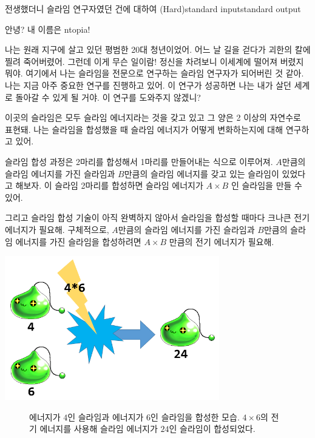 \begin{problem}{전생했더니 슬라임 연구자였던 건에 대하여 (Hard)}{standard input}{standard output}

안녕? 내 이름은 ntopia!

나는 원래 지구에 살고 있던 평범한 20대 청년이었어. 어느 날 길을 걷다가 괴한의 칼에 찔려
죽어버렸어. 그런데 이게 무슨 일이람! 정신을 차려보니 이세계에 떨어져 버렸지 뭐야.
여기에서 나는 슬라임을 전문으로 연구하는 슬라임 연구자가 되어버린 것 같아.
나는 지금 아주 중요한 연구를 진행하고 있어. 이 연구가 성공하면 나는 내가 살던 세계로
돌아갈 수 있게 될 거야. 이 연구를 도와주지 않겠니?

이곳의 슬라임은 모두 슬라임 에너지라는 것을 갖고 있고 그 양은 2 이상의 자연수로 표현돼.
나는 슬라임을 합성했을 때 슬라임 에너지가 어떻게 변화하는지에 대해 연구하고 있어.

슬라임 합성 과정은 2마리를 합성해서 1마리를 만들어내는 식으로 이루어져.
$A$만큼의 슬라임 에너지를 가진 슬라임과 $B$만큼의 슬라임 에너지를 갖고 있는
슬라임이 있었다고 해보자. 이 슬라임 2마리를 합성하면
슬라임 에너지가 $A \times B$ 인 슬라임을 만들 수 있어.

그리고 슬라임 합성 기술이 아직 완벽하지 않아서 슬라임을 합성할 때마다
크나큰 전기 에너지가 필요해. 구체적으로,
$A$만큼의 슬라임 에너지를 가진 슬라임과 $B$만큼의 슬라임 에너지를 가진 슬라임을
합성하려면 $A \times B$ 만큼의 전기 에너지가 필요해.

\begin{center}
  \includegraphics[width=0.7\textwidth]{slime_compose.png}
  \begin{figure}[!h]
  \captionsetup{labelformat=empty,justification=centering}
  \caption{에너지가 $4$인 슬라임과 에너지가 $6$인 슬라임을 합성한 모습. $4\times6$의 전기 에너지를 사용해 슬라임 에너지가 $24$인 슬라임이 합성되었다.}
  \end{figure}
\end{center}


\end{problem}
